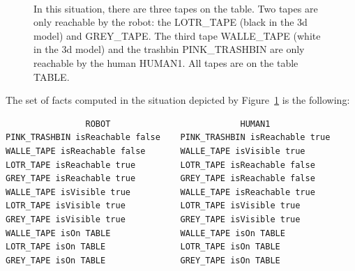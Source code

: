 \documentclass{svmult}
\begin{document}
\begin{figure}[ht!]
   \label{fig:sparkSubfigures}
   \begin{center}
%
       \\ %
%
   \end{center}

   \caption{%
     In this situation, there are three tapes on the table. Two tapes
     are only reachable by the robot: the LOTR\_TAPE (black in the 3d
     model) and GREY\_TAPE. The third tape WALLE\_TAPE (white in the
     3d model) and the trashbin PINK\_TRASHBIN are only reachable by
     the human HUMAN1. All tapes are on the table TABLE.  }%

\end{figure}

The set of facts computed in the situation depicted by
Figure~\ref{fig:sparkSubfigures} is the following:
\begin{footnotesize}
\begin{verbatim}
                ROBOT                          HUMAN1
PINK_TRASHBIN isReachable false    PINK_TRASHBIN isReachable true 
WALLE_TAPE isReachable false       WALLE_TAPE isVisible true 
LOTR_TAPE isReachable true         LOTR_TAPE isReachable false 
GREY_TAPE isReachable true         GREY_TAPE isReachable false
WALLE_TAPE isVisible true          WALLE_TAPE isReachable true 
LOTR_TAPE isVisible true           LOTR_TAPE isVisible true 
GREY_TAPE isVisible true           GREY_TAPE isVisible true 
WALLE_TAPE isOn TABLE              WALLE_TAPE isOn TABLE 
LOTR_TAPE isOn TABLE               LOTR_TAPE isOn TABLE 
GREY_TAPE isOn TABLE               GREY_TAPE isOn TABLE 
\end{verbatim}
\end{footnotesize}
\end{document}

